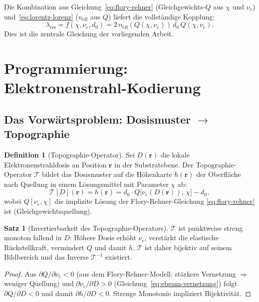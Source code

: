 ﻿\documentclass[a4paper,12pt]{article}
\theoremstyle{definition}
\newtheorem{definition}{Definition}[section]
\newtheorem{satz}{Satz}[section]
\newcommand{\neff}{n_\mathrm{eff}}
\newcommand{\vect}[1]{\bm{#1}}
\begin{document}
	Die Kombination aus Gleichung~\eqref{eq:flory-rehner} (Gleichgewichts-$Q$
	aus $\chi$ und $\nu_e$) und~\eqref{eq:lorentz-lorenz} ($\neff$ aus $Q$)
	liefert die vollständige Kopplung:
	\begin{equation}
		\boxed{\lambda_\mathrm{res} = f(\chi, \nu_e, d_0) = 2\,\neff(Q(\chi,\nu_e))\,d_0\,Q(\chi,\nu_e).}
		\label{eq:kopplungsgleichung}
	\end{equation}
	Dies ist die zentrale Gleichung der vorliegenden Arbeit.
	
	\section{Programmierung: Elektronenstrahl-Kodierung}
	\label{sec:textur}
	
	\subsection{Das Vorwärtsproblem: Dosismuster $\to$ Topographie}
	
	\begin{definition}[Topographie-Operator]
		\label{def:topo-operator}
		Sei $D(\vect{r})$ die lokale Elektronenstrahldosis an Position $\vect{r}$
		in der Substratebene. Der Topographie-Operator $\mathcal{T}$ bildet das
		Dosismuster auf die Höhenkarte $h(\vect{r})$ der Oberfläche nach Quellung
		in einem Lösungsmittel mit Parameter $\chi$ ab:
		\begin{equation}
			\mathcal{T}[D](\vect{r}) = h(\vect{r})
			= d_0 \cdot Q\bigl[\nu_e(D(\vect{r})),\, \chi\bigr] - d_0,
			\label{eq:topo-operator}
		\end{equation}
		wobei $Q[\nu_e, \chi]$ die implizite Lösung der Flory-Rehner-Gleichung
		\eqref{eq:flory-rehner} ist (Gleichgewichtsquellung).
	\end{definition}
	
	\begin{satz}[Invertierbarkeit des Topographie-Operators]
		\label{satz:invertierbarkeit}
		$\mathcal{T}$ ist punktweise streng monoton fallend in $D$: Höhere Dosis
		erhöht $\nu_e$, verstärkt die elastische Rückstellkraft, vermindert $Q$
		und damit $h$. $\mathcal{T}$ ist daher bijektiv auf seinem Bildbereich
		und das Inverse $\mathcal{T}^{-1}$ existiert.
	\end{satz}
	
	\begin{proof}
		Aus $\partial Q/\partial\nu_e < 0$ (aus dem Flory-Rehner-Modell:
		stärkere Vernetzung $\Rightarrow$ weniger Quellung) und
		$\partial\nu_e/\partial D > 0$ (Gleichung~\eqref{eq:ebeam-vernetzung})
		folgt $\partial Q/\partial D < 0$ und damit $\partial h/\partial D < 0$.
		Strenge Monotonie impliziert Bijektivität.
	\end{proof}
	
\end{document}
